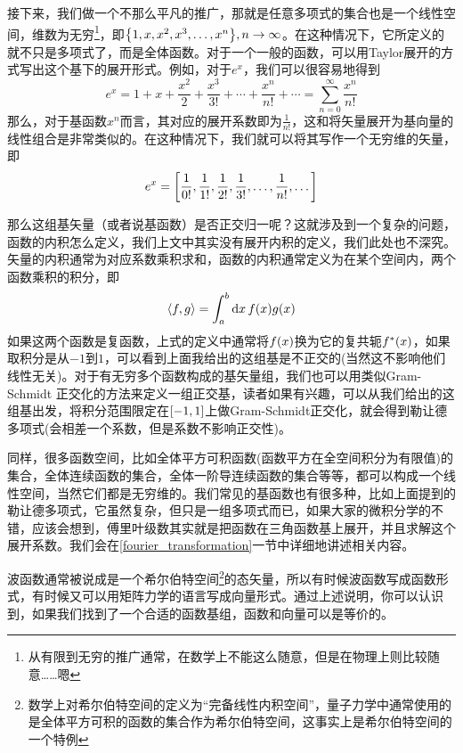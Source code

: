 \documentclass[12pt,a4paper,openany,twoside]{book}
\numberwithin{equation}{section}
\newcommand{\mean}[1]{\left\langle #1 \right\rangle}
\begin{document}
          接下来，我们做一个不那么平凡的推广，那就是任意多项式的集合也是一个线性空间，维数为无穷\footnote{从有限到无穷的推广通常，在数学上不能这么随意，但是在物理上则比较随意……嗯}，即$\qty{1,x,x^2,x^3,\dots,x^n}, n\rightarrow\infty$。在这种情况下，它所定义的就不只是多项式了，而是全体函数。对于一个一般的函数，可以用Taylor展开的方式写出这个基下的展开形式。例如，对于$e^x$，我们可以很容易地得到
          \begin{equation}
            e^x=1+x+\frac{x^2}{2}+\frac{x^3}{3!}+\cdots+\frac{x^n}{n!}+\cdots=\sum_{n=0}^\infty{\frac{x^n}{n!}}
          \end{equation}
          那么，对于基函数$x^n$而言，其对应的展开系数即为$\frac{1}{n!}$，这和将矢量展开为基向量的线性组合是非常类似的。在这种情况下，我们就可以将其写作一个无穷维的矢量，即
          \begin{equation}
            e^x=\qty[\frac{1}{0!},\frac{1}{1!},\frac{1}{2!},\frac{1}{3!},\dots,\frac{1}{n!},\dots]
          \end{equation}

          那么这组基矢量（或者说基函数）是否正交归一呢？这就涉及到一个复杂的问题，函数的内积怎么定义，我们上文中其实没有展开内积的定义，我们此处也不深究。矢量的内积通常为对应系数乘积求和，函数的内积通常定义为在某个空间内，两个函数乘积的积分，即
          \begin{equation}
            \mean{f,g}=\int_a^b{\dd{x} f\qty(x)g\qty(x)}
          \end{equation}
          如果这两个函数是复函数，上式的定义中通常将$f\qty(x)$换为它的复共轭$f^*\qty(x)$，如果取积分是从$-1$到$1$，可以看到上面我给出的这组基是不正交的(当然这不影响他们线性无关)。对于有无穷多个函数构成的基矢量组，我们也可以用类似Gram-Schmidt 正交化的方法来定义一组正交基，读者如果有兴趣，可以从我们给出的这组基出发，将积分范围限定在$\qty[-1,1]$上做Gram-Schmidt正交化，就会得到勒让德多项式(会相差一个系数，但是系数不影响正交性)。

          同样，很多函数空间，比如全体平方可积函数(函数平方在全空间积分为有限值)的集合，全体连续函数的集合，全体一阶导连续函数的集合等等，都可以构成一个线性空间，当然它们都是无穷维的。我们常见的基函数也有很多种，比如上面提到的勒让德多项式，它虽然复杂，但只是一组多项式而已，如果大家的微积分学的不错，应该会想到，傅里叶级数其实就是把函数在三角函数基上展开，并且求解这个展开系数。我们会在\ref{fourier_transformation}一节中详细地讲述相关内容。
          
          波函数通常被说成是一个希尔伯特空间\footnote{数学上对希尔伯特空间的定义为“完备线性内积空间”，量子力学中通常使用的是全体平方可积的函数的集合作为希尔伯特空间，这事实上是希尔伯特空间的一个特例}的态矢量，所以有时候波函数写成函数形式，有时候又可以用矩阵力学的语言写成向量形式。通过上述说明，你可以认识到，如果我们找到了一个合适的函数基组，函数和向量可以是等价的。
    
\end{document}
